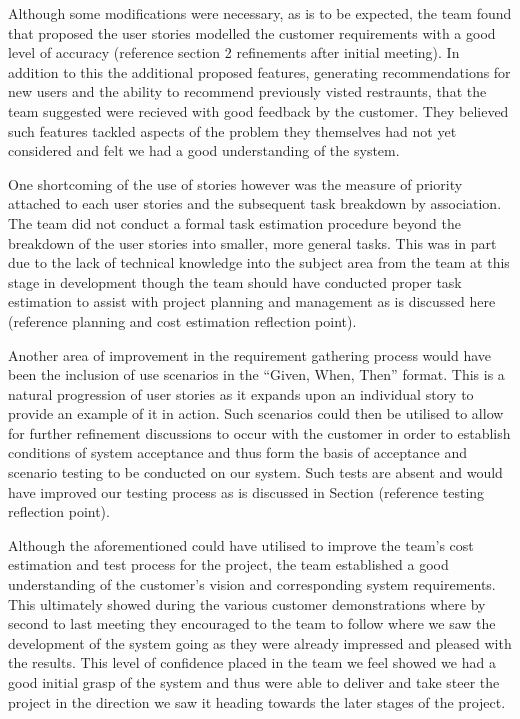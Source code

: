 \documentclass{l3proj}
\begin{document}
Although some modifications were necessary, as is to be expected, the team found that proposed the user stories modelled the customer requirements with a good level of accuracy (reference section 2 refinements after initial meeting). In addition to this the additional proposed features, generating recommendations for new users and the ability to recommend previously visted restraunts, that the team suggested were recieved with good feedback by the customer. They believed such features tackled aspects of the problem they themselves had not yet considered and felt we had a good understanding of the system. 

One shortcoming of the use of stories however was the measure of priority attached to each user stories and the subsequent task breakdown by association. The team did not conduct a formal task estimation procedure beyond the breakdown of the user stories into smaller, more general tasks. This was in part due to the lack of technical knowledge into the subject area from the team at this stage in development though the team should have conducted proper task estimation to assist with project planning and management as is discussed here (reference planning and cost estimation reflection point). 

Another area of improvement in the requirement gathering process would have been the inclusion of use scenarios in the “Given, When, Then” format. This is a natural progression of user stories as it expands upon an individual story to provide an example of it in action. Such scenarios could then be utilised to allow for further refinement discussions to occur with the customer in order to establish conditions of system acceptance and thus form the basis of acceptance and scenario testing to be conducted on our system. Such tests are absent and would have improved our testing process as is discussed in Section (reference testing reflection point).  

Although the aforementioned could have utilised to improve the team's cost estimation and test process for the project, the team established a good understanding of the customer's vision and corresponding system requirements. This ultimately showed during the various customer demonstrations where by second to last meeting they encouraged to the team to follow where we saw the development of the system going as they were already impressed and pleased with the results. This level of confidence placed in the team we feel showed we had a good initial grasp of the system and thus were able to deliver and take steer the project in the direction we saw it heading towards the later stages of the project. 
\end{document}
